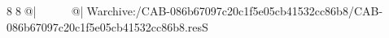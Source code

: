 8  8  @|                                                   @| W   archive:/CAB-086b67097c20c1f5e05cb41532cc86b8/CAB-086b67097c20c1f5e05cb41532cc86b8.resS 